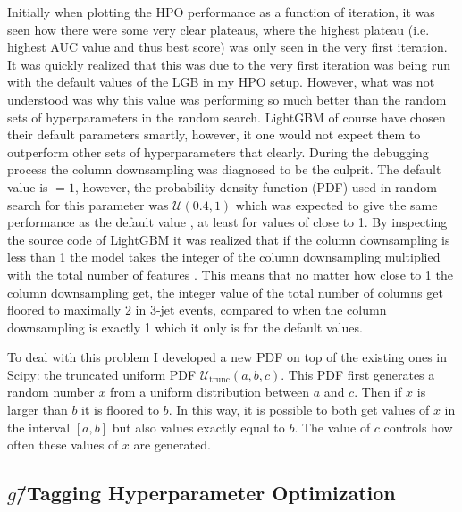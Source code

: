 Initially when plotting the HPO performance as a function of iteration, it was seen how there were some very clear plateaus, where the highest plateau (i.e. highest AUC value and thus best score) was only seen in the very first iteration. It was quickly realized that this was due to the very first iteration was being run with the default values of the LGB in my HPO setup. However, what was not understood was why this value was performing so much better than the random sets of hyperparameters in the random search. LightGBM of course have chosen their default parameters smartly, however, it one would not expect them to outperform other sets of hyperparameters that clearly. During the debugging process the column downsampling  was diagnosed to be the culprit. The default value is $=1$, however, the probability density function (PDF) used in random search for this parameter was $\mathcal{U}(0.4, 1)$ which was expected to give the same performance as the default value , at least for values of  close to \num{1}. By inspecting the source code of LightGBM it was realized that if the column downsampling is less than \num{1} the model takes the integer of the column downsampling multiplied with the total number of features \autocite{MicrosoftLightGBM}. This means that no matter how close to \num{1} the column downsampling get, the integer value of the total number of columns get floored to {maximally} \num{2} in 3-jet events, compared to when the column downsampling is exactly \num{1} which it only is for the default values.

To deal with this problem I developed a new PDF on top of the existing ones in Scipy: the truncated uniform PDF $\mathcal{U}_\mathrm{trunc}(a, b, c)$. This PDF first generates a random number $x$ from a uniform distribution between $a$ and $c$. Then if $x$ is larger than $b$ it is floored to $b$. In this way, it is possible to both get values of $x$ in the interval $[a, b]$ but also values exactly equal to $b$. The value of $c$ controls how often these  values of $x$ are generated.

\subsection{$g$\=/Tagging Hyperparameter Optimization}

